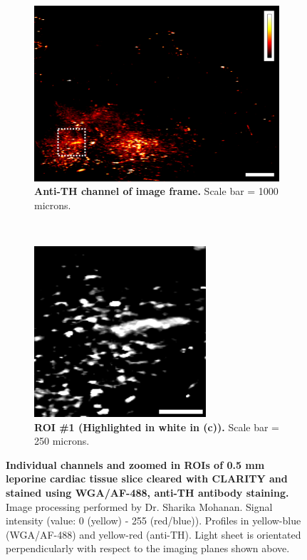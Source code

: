\begin{figure}[H]
    \begin{subfigure}[t]{0.5\textwidth}
    \includegraphics[width=1\linewidth]{Images/anti_Th_channel.png}
    \caption{\textbf{Anti-TH channel of image frame.} Scale bar = 1000 microns.}
    \end{subfigure}
    \medskip
    ~
    \begin{subfigure}[t]{0.45\textwidth}
    \centering
    \includegraphics[width=0.8\linewidth]{Images/anti_th_zoomin.png}
    \caption{\textbf{ROI \#1 (Highlighted in white in (c)).} Scale bar = 250 microns.}
    \end{subfigure}
    \medskip
    
\caption{\textbf{Individual channels and zoomed in ROIs of 0.5 mm leporine cardiac tissue slice cleared with CLARITY and stained using WGA/AF-488, anti-TH antibody staining.} Image processing performed by Dr. Sharika Mohanan. Signal intensity (value: 0 (yellow) - 255 (red/blue)). Profiles in yellow-blue (WGA/AF-488) and yellow-red (anti-TH). Light sheet is orientated perpendicularly with respect to the imaging planes shown above.}
\end{figure}

